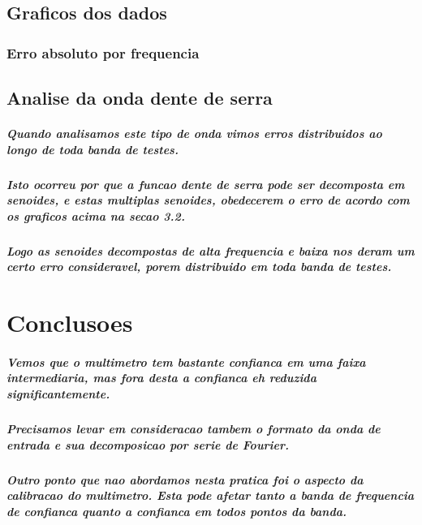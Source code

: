 \documentclass[12pt,twoside, a4paper, twocolumn]{article}
\begin{document}
\subsection{Graficos dos dados}

\subsubsection{Erro absoluto por frequencia}




\subsection{Analise da onda dente de serra}

\subparagraph*{Quando analisamos este tipo de onda vimos erros distribuidos ao longo de toda banda de testes.}

\subparagraph*{Isto ocorreu por que a funcao dente de serra pode ser decomposta em senoides, e estas multiplas senoides, obedecerem o erro de acordo com os graficos acima na secao \emph{3.2}.}


\subparagraph*{Logo as senoides decompostas de alta frequencia e baixa nos deram um certo erro consideravel, porem distribuido em toda banda  de testes.}

\newpage
\section{Conclusoes}

\subparagraph*{Vemos que o multimetro tem bastante confianca em uma faixa intermediaria, mas fora desta a confianca eh reduzida significantemente.}

\subparagraph*{Precisamos levar em consideracao tambem o formato da onda de entrada e sua decomposicao por serie de Fourier.}

\subparagraph*{Outro ponto que nao abordamos nesta pratica foi o aspecto da calibracao do multimetro. Esta pode afetar tanto a banda de frequencia de confianca quanto a confianca em todos pontos da banda.}
\end{document}
